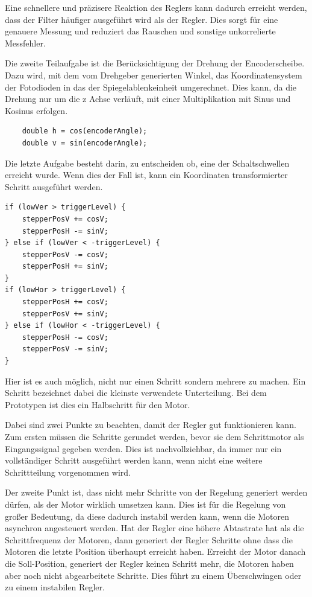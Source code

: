 Eine schnellere und präzisere Reaktion des Reglers kann dadurch erreicht werden, dass der Filter häufiger ausgeführt wird als der Regler.
Dies sorgt für eine genauere Messung und reduziert das Rauschen und sonstige unkorrelierte Messfehler.

Die zweite Teilaufgabe ist die Berücksichtigung der Drehung der Encoderscheibe.
Dazu wird, mit dem vom Drehgeber generierten Winkel, das Koordinatensystem der Fotodioden in das der Spiegelablenkeinheit umgerechnet.
Dies kann, da die Drehung nur um die z Achse verläuft, mit einer Multiplikation mit Sinus und Kosinus erfolgen.

\begin{minipage}{\textwidth}
	\begin{lstlisting}
	double h = cos(encoderAngle);
	double v = sin(encoderAngle);
	\end{lstlisting}
\end{minipage}

Die letzte Aufgabe besteht darin, zu entscheiden ob, eine der Schaltschwellen erreicht wurde.
Wenn dies der Fall ist, kann ein Koordinaten transformierter Schritt ausgeführt werden.

\begin{minipage}{\textwidth}
\begin{lstlisting}
if (lowVer > triggerLevel) {
	stepperPosV += cosV;
	stepperPosH -= sinV;
} else if (lowVer < -triggerLevel) {
	stepperPosV -= cosV;
	stepperPosH += sinV;
}
if (lowHor > triggerLevel) {
	stepperPosH += cosV;
	stepperPosV += sinV;
} else if (lowHor < -triggerLevel) {
	stepperPosH -= cosV;
	stepperPosV -= sinV;
}
\end{lstlisting}
\end{minipage}

Hier ist es auch möglich, nicht nur einen Schritt sondern mehrere zu machen.
Ein Schritt bezeichnet dabei die kleinste verwendete Unterteilung.
Bei dem Prototypen ist dies ein Halbschritt für den Motor.

Dabei sind zwei Punkte zu beachten, damit der Regler gut funktionieren kann.
Zum ersten müssen die Schritte gerundet werden, bevor sie dem Schrittmotor als Eingangssignal gegeben werden.
Dies ist nachvollziehbar, da immer nur ein vollständiger Schritt ausgeführt werden kann, wenn nicht eine weitere Schrittteilung vorgenommen wird.

Der zweite Punkt ist, dass nicht mehr Schritte von der Regelung generiert werden dürfen, als der Motor wirklich umsetzen kann.
Dies ist für die Regelung von großer Bedeutung, da diese dadurch instabil werden kann, wenn die Motoren asynchron angesteuert werden.
Hat der Regler eine höhere Abtastrate hat als die Schrittfrequenz der Motoren, dann generiert der Regler Schritte ohne dass die Motoren die letzte Position überhaupt erreicht haben.
Erreicht der Motor danach die Soll-Position, generiert der Regler keinen Schritt mehr, die Motoren haben aber noch nicht abgearbeitete Schritte.
Dies führt zu einem Überschwingen oder zu einem instabilen Regler.
